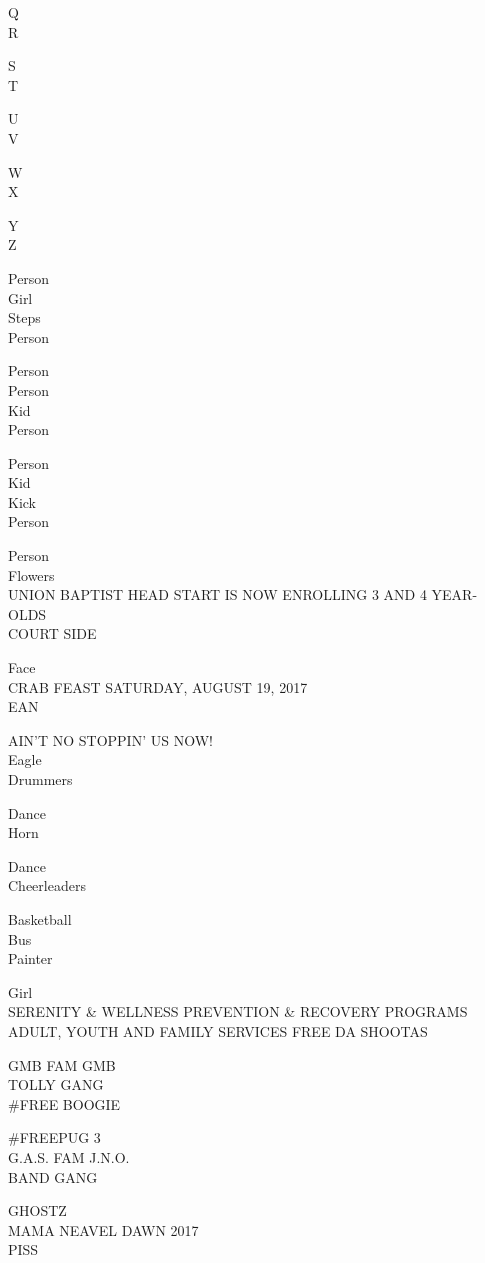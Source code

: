 \documentclass[10pt,letterpaper]{article}
\begin{document}
Q\\
R

S\\
T

U\\
V

W\\
X

Y\\
Z

Person\\
Girl\\
Steps\\
Person

Person\\
Person\\
Kid\\
Person

Person\\
Kid\\
Kick\\
Person

Person\\
Flowers\\
UNION BAPTIST HEAD START IS NOW ENROLLING 3 AND 4 YEAR{-}OLDS\\
COURT SIDE

Face\\
CRAB FEAST SATURDAY, AUGUST 19, 2017\\
EAN

AIN'T NO STOPPIN' US NOW!\\
Eagle\\
Drummers

Dance\\
Horn

Dance\\
Cheerleaders

Basketball\\
Bus\\
Painter

Girl\\
SERENITY \& WELLNESS PREVENTION \& RECOVERY PROGRAMS ADULT, YOUTH AND FAMILY SERVICES FREE DA SHOOTAS

GMB FAM GMB\\
TOLLY GANG\\
\#FREE BOOGIE

\#FREEPUG 3\\
G.A.S. FAM J.N.O.\\
BAND GANG

GHOSTZ\\
MAMA NEAVEL DAWN 2017\\
PISS
\end{document}
